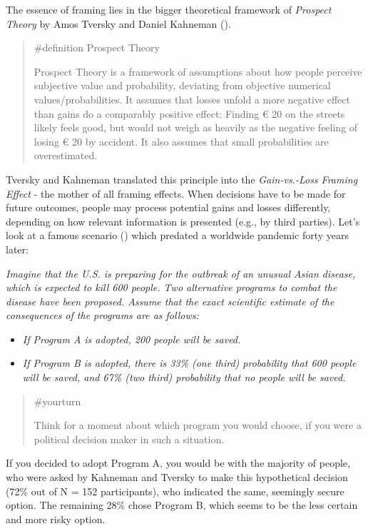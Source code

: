\documentclass[
  letterpaper,
]{book}
\providecommand{\tightlist}{%
  \setlength{\itemsep}{0pt}\setlength{\parskip}{0pt}}\usepackage{longtable,booktabs,array}
\begin{document}
The essence of framing lies in the bigger theoretical framework of
\emph{Prospect Theory} by Amos Tversky and Daniel Kahneman
().

\begin{quote}
\label{def-prospecttheory}{\#definition} Prospect Theory

Prospect Theory is a framework of assumptions about how people perceive
subjective value and probability, deviating from objective numerical
values/probabilities. It assumes that losses unfold a more negative
effect than gains do a comparably positive effect: Finding € 20 on the
streets likely feels good, but would not weigh as heavily as the
negative feeling of losing € 20 by accident. It also assumes that small
probabilities are overestimated.
\end{quote}

Tversky and Kahneman translated this principle into the
\emph{Gain-vs.-Loss Framing Effect} - the mother of all framing effects.
When decisions have to be made for future outcomes, people may process
potential gains and losses differently, depending on how relevant
information is presented (e.g., by third parties). Let's look at a
famous scenario () which predated a worldwide pandemic forty years later:

\emph{Imagine that the U.S. is preparing for the outbreak of an unusual
Asian disease, which is expected to kill 600 people. Two alternative
programs to combat the disease have been proposed. Assume that the exact
scientific estimate of the consequences of the programs are as follows:}

\begin{itemize}
\tightlist
\item
  \emph{If Program A is adopted, 200 people will be saved.}
\item
  \emph{If Program B is adopted, there is 33\% (one third) probability
  that 600 people will be saved, and 67\% (two third) probability that
  no people will be saved.}
\end{itemize}

\begin{quote}
{\#yourturn}

Think for a moment about which program you would choose, if you were a
political decision maker in such a situation.
\end{quote}

If you decided to adopt Program A, you would be with the majority of
people, who were asked by Kahneman and Tversky to make this hypothetical
decision (72\% out of N = 152 participants), who indicated the same,
seemingly secure option. The remaining 28\% chose Program B, which seems
to be the less certain and more risky option.
\end{document}
